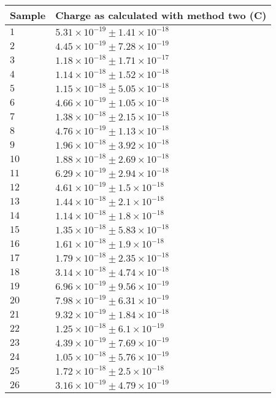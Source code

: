\begin{tabular}{| p{} | p{} |}
\hline
Sample & Charge as calculated with method two (C)\\
\hline
$1$ & $5.31\times 10^{-19} \pm 1.41\times10^{-18}$\\
$2$ & $4.45\times 10^{-19} \pm 7.28\times10^{-19}$\\
$3$ & $1.18\times 10^{-18} \pm 1.71\times10^{-17}$\\
$4$ & $1.14\times 10^{-18} \pm 1.52\times10^{-18}$\\
$5$ & $1.15\times 10^{-18} \pm 5.05\times10^{-18}$\\
$6$ & $4.66\times 10^{-19} \pm 1.05\times10^{-18}$\\
$7$ & $1.38\times 10^{-18} \pm 2.15\times10^{-18}$\\
$8$ & $4.76\times 10^{-19} \pm 1.13\times10^{-18}$\\
$9$ & $1.96\times 10^{-18} \pm 3.92\times10^{-18}$\\
$10$ & $1.88\times 10^{-18} \pm 2.69\times10^{-18}$\\
$11$ & $6.29\times 10^{-19} \pm 2.94\times10^{-18}$\\
$12$ & $4.61\times 10^{-19} \pm 1.5\times10^{-18}$\\
$13$ & $1.44\times 10^{-18} \pm 2.1\times10^{-18}$\\
$14$ & $1.14\times 10^{-18} \pm 1.8\times10^{-18}$\\
$15$ & $1.35\times 10^{-18} \pm 5.83\times10^{-18}$\\
$16$ & $1.61\times 10^{-18} \pm 1.9\times10^{-18}$\\
$17$ & $1.79\times 10^{-18} \pm 2.35\times10^{-18}$\\
$18$ & $3.14\times 10^{-18} \pm 4.74\times10^{-18}$\\
$19$ & $6.96\times 10^{-19} \pm 9.56\times10^{-19}$\\
$20$ & $7.98\times 10^{-19} \pm 6.31\times10^{-19}$\\
$21$ & $9.32\times 10^{-19} \pm 1.84\times10^{-18}$\\
$22$ & $1.25\times 10^{-18} \pm 6.1\times10^{-19}$\\
$23$ & $4.39\times 10^{-19} \pm 7.69\times10^{-19}$\\
$24$ & $1.05\times 10^{-18} \pm 5.76\times10^{-19}$\\
$25$ & $1.72\times 10^{-18} \pm 2.5\times10^{-18}$\\
$26$ & $3.16\times 10^{-19} \pm 4.79\times10^{-19}$\\

\end{tabular}
